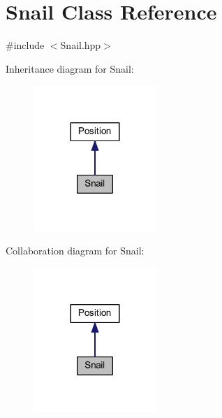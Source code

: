 \hypertarget{class_snail}{}\section{Snail Class Reference}
\label{class_snail}


{\ttfamily \#include $<$Snail.\+hpp$>$}



Inheritance diagram for Snail\+:\nopagebreak
\begin{figure}[H]
\begin{center}
\leavevmode
\includegraphics[width=132pt]{class_snail__inherit__graph}
\end{center}
\end{figure}


Collaboration diagram for Snail\+:\nopagebreak
\begin{figure}[H]
\begin{center}
\leavevmode
\includegraphics[width=132pt]{class_snail__coll__graph}
\end{center}
\end{figure}
